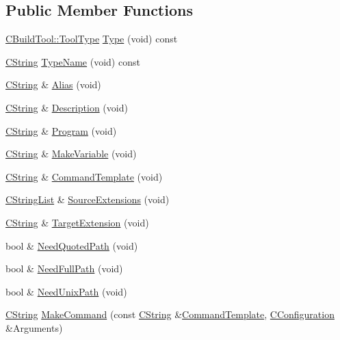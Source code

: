 \subsection*{Public Member Functions}
\begin{DoxyCompactItemize}
\item 
\hyperlink{classCBuildTool_a1a622843617ddf9b0ebb1c09c3437e6d}{C\-Build\-Tool\-::\-Tool\-Type} \hyperlink{classCBuildTool_abd560ed1c839d6ff4c0be5a3d31c83fa}{Type} (void) const 
\item 
\hyperlink{classCString}{C\-String} \hyperlink{classCBuildTool_a8a78c520f210a52e89de6256ed2fd8af}{Type\-Name} (void) const 
\item 
\hyperlink{classCString}{C\-String} \& \hyperlink{classCBuildTool_a9f4bd07f77e0e5017fd437d4da7c9746}{Alias} (void)
\item 
\hyperlink{classCString}{C\-String} \& \hyperlink{classCBuildTool_a513c6a5dade6a3f397ca83dd32a6662b}{Description} (void)
\item 
\hyperlink{classCString}{C\-String} \& \hyperlink{classCBuildTool_a8405382b1f3b433ee55e879e74d65215}{Program} (void)
\item 
\hyperlink{classCString}{C\-String} \& \hyperlink{classCBuildTool_a971ed2f2b55d9f1127a218484b75aff6}{Make\-Variable} (void)
\item 
\hyperlink{classCString}{C\-String} \& \hyperlink{classCBuildTool_ab5238ad27196fd6d11650dd633c66284}{Command\-Template} (void)
\item 
\hyperlink{classCStringList}{C\-String\-List} \& \hyperlink{classCBuildTool_a6a764334cbcc2bf917237286938ad8fd}{Source\-Extensions} (void)
\item 
\hyperlink{classCString}{C\-String} \& \hyperlink{classCBuildTool_a3f957896383550c69d8f3136037b74bd}{Target\-Extension} (void)
\item 
bool \& \hyperlink{classCBuildTool_ab9e88543f1f7e2a760036ebff1c49298}{Need\-Quoted\-Path} (void)
\item 
bool \& \hyperlink{classCBuildTool_adae57be5c380f9e4e2a2934d7929816c}{Need\-Full\-Path} (void)
\item 
bool \& \hyperlink{classCBuildTool_a2b0f6b103a1d6de571da86a66a4853e7}{Need\-Unix\-Path} (void)
\item 
\hyperlink{classCString}{C\-String} \hyperlink{classCBuildTool_a21215cc9d80059ce00ed853b87e7d38d}{Make\-Command} (const \hyperlink{classCString}{C\-String} \&\hyperlink{classCBuildTool_ab5238ad27196fd6d11650dd633c66284}{Command\-Template}, \hyperlink{classCConfiguration}{C\-Configuration} \&Arguments)

\end{DoxyCompactItemize}
